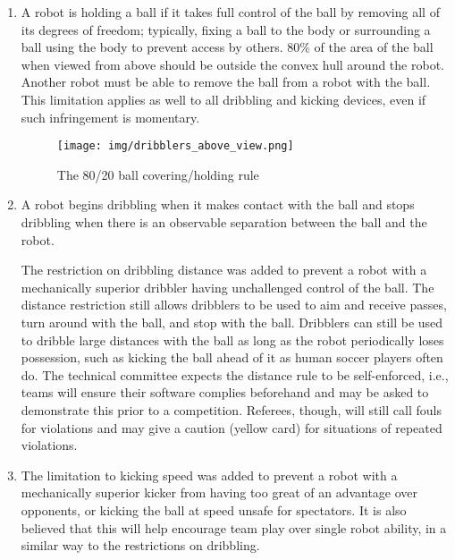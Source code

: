 \begin{enumerate}
\item
A robot is holding a ball if it takes full control of the ball by removing all of its degrees of freedom; typically, fixing a ball to the body or surrounding a ball using the body to prevent access by others.
80\% of the area of the ball when viewed from above should be outside the convex hull around the robot.
Another robot must be able to remove the ball from a robot with the ball.
This limitation applies as well to all dribbling and kicking devices, even if such infringement is momentary.

\begin{figure}[ht] %
	\centering
	\texttt{[image: img/dribblers\_above\_view.png]}
	\caption{The 80/20 ball covering/holding rule}
	\label{fig:20-rule}
\end{figure}

\item
A robot begins dribbling when it makes contact with the ball and stops dribbling when there is an observable separation between the ball and the robot.

The restriction on dribbling distance was added to prevent a robot with a mechanically superior dribbler having unchallenged control of the ball.
The distance restriction still allows dribblers to be used to aim and receive passes, turn around with the ball, and stop with the ball.
Dribblers can still be used to dribble large distances with the ball as long as the robot periodically loses possession, such as kicking the ball ahead of it as human soccer players often do.
The technical committee expects the distance rule to be self-enforced, i.e., teams will ensure their software complies beforehand and may be asked to demonstrate this prior to a competition.
Referees, though, will still call fouls for violations and may give a caution (yellow card) for situations of repeated violations.

\item
The limitation to kicking speed was added to prevent a robot with a mechanically superior kicker from having too great of an advantage over opponents, or kicking the ball at speed unsafe for spectators.
It is also believed that this will help encourage team play over single robot ability, in a similar way to the restrictions on dribbling.


\end{enumerate}
